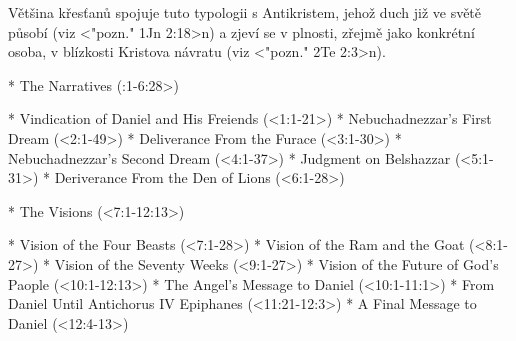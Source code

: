 Většina křesťanů spojuje tuto typologii s Antikristem, jehož duch již ve světě působí (viz <"pozn." 1Jn 2:18>n) a zjeví se v plnosti, zřejmě jako konkrétní osoba, v blízkosti Kristova návratu (viz <"pozn." 2Te 2:3>n).




\Outline

\begitems
{}
* The Narratives (:1-6:28>)

  \begitems
  * Vindication of Daniel and  His Freiends (<1:1-21>)
  * Nebuchadnezzar's First Dream (<2:1-49>)
  * Deliverance From the Furace (<3:1-30>)
  * Nebuchadnezzar's Second Dream (<4:1-37>)
  * Judgment on Belshazzar (<5:1-31>)
  * Deriverance From the Den of Lions (<6:1-28>)
  \enditems

* The Visions (<7:1-12:13>)

  \begitems
  * Vision of the Four Beasts (<7:1-28>)
  * Vision of the Ram and the Goat (<8:1-27>)
  * Vision of the Seventy Weeks (<9:1-27>)
  * Vision of the Future of God's Paople (<10:1-12:13>)
    \begitems
    * The Angel's Message to Daniel (<10:1-11:1>)
    * From Daniel Until Antichorus IV Epiphanes (<11:21-12:3>)
    * A Final Message to Daniel (<12:4-13>)
    \enditems
  \enditems

\enditems
